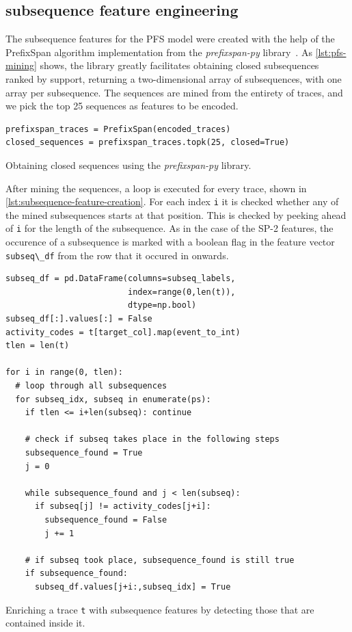 \subsection*{subsequence feature engineering}
The subsequence features for the PFS model were created with the help of the PrefixSpan algorithm implementation from the \textit{prefixspan-py} library~\cite{web:prefixspan-py}. As \autoref{lst:pfs-mining} shows, the library greatly facilitates obtaining closed subsequences ranked by support, returning a two-dimensional array of subsequences, with one array per subsequence. The sequences are mined from the entirety of traces, and we pick the top 25 sequences as features to be encoded.

\begin{listing}[ht]
\begin{verbatim}
prefixspan_traces = PrefixSpan(encoded_traces)
closed_sequences = prefixspan_traces.topk(25, closed=True)
\end{verbatim}
\caption{Obtaining closed sequences using the \textit{prefixspan-py} library.}
\label{lst:pfs-mining}
\end{listing}

After mining the sequences, a loop is executed for every trace, shown in \autoref{lst:subsequence-feature-creation}. For each index \verb=i= it is checked whether any of the mined subsequences starts at that position. This is checked by peeking ahead of \verb=i= for the length of the subsequence. As in the case of the SP-2 features, the occurence of a subsequence is marked with a boolean flag in the feature vector \verb=subseq\_df= from the row that it occured in onwards.

\begin{listing}[ht]
\begin{verbatim}
subseq_df = pd.DataFrame(columns=subseq_labels,
                         index=range(0,len(t)),
                         dtype=np.bool)
subseq_df[:].values[:] = False
activity_codes = t[target_col].map(event_to_int)
tlen = len(t)

for i in range(0, tlen):
  # loop through all subsequences
  for subseq_idx, subseq in enumerate(ps):
    if tlen <= i+len(subseq): continue

    # check if subseq takes place in the following steps
    subsequence_found = True
    j = 0

    while subsequence_found and j < len(subseq):
      if subseq[j] != activity_codes[j+i]:
        subsequence_found = False
        j += 1

    # if subseq took place, subsequence_found is still true
    if subsequence_found:
      subseq_df.values[j+i:,subseq_idx] = True
\end{verbatim}
\caption{Enriching a trace \texttt{t} with subsequence features by detecting those that are contained inside it.}
\label{lst:subsequence-feature-creation}
\end{listing}

